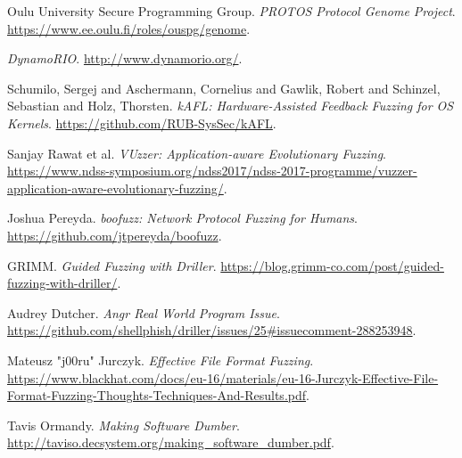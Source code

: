 \begin{thebibliography}{99}
  Oulu University Secure Programming Group.
  \textit{PROTOS Protocol Genome Project}.
  \url{https://www.ee.oulu.fi/roles/ouspg/genome}.

  \textit{DynamoRIO}.
  \url{http://www.dynamorio.org/}.

  Schumilo, Sergej and Aschermann, Cornelius and Gawlik, Robert and Schinzel, Sebastian and Holz, Thorsten.
  \textit{kAFL: Hardware-Assisted Feedback Fuzzing for OS Kernels}.
  \url{https://github.com/RUB-SysSec/kAFL}.

  Sanjay Rawat et al.
  \textit{VUzzer: Application-aware Evolutionary Fuzzing}.
  \url{https://www.ndss-symposium.org/ndss2017/ndss-2017-programme/vuzzer-application-aware-evolutionary-fuzzing/}.

  Joshua Pereyda.
  \textit{boofuzz: Network Protocol Fuzzing for Humans}.
  \url{https://github.com/jtpereyda/boofuzz}.

  GRIMM.
  \textit{Guided Fuzzing with Driller}.
  \url{https://blog.grimm-co.com/post/guided-fuzzing-with-driller/}.

  Audrey Dutcher.
  \textit{Angr Real World Program Issue}.
  \url{https://github.com/shellphish/driller/issues/25#issuecomment-288253948}.

  Mateusz "j00ru" Jurczyk.
  \textit{Effective File Format Fuzzing}.
  \url{https://www.blackhat.com/docs/eu-16/materials/eu-16-Jurczyk-Effective-File-Format-Fuzzing-Thoughts-Techniques-And-Results.pdf}.

  Tavis Ormandy.
  \textit{Making Software Dumber}.
  \url{http://taviso.decsystem.org/making_software_dumber.pdf}.


\end{thebibliography}
